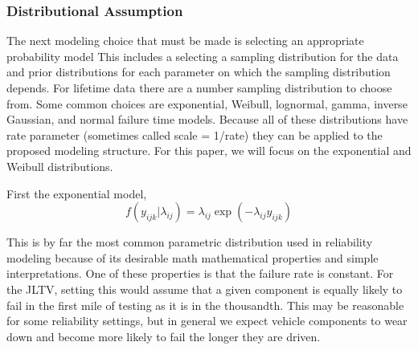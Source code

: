 \documentclass[12pt]{article}
\begin{document}
\subsubsection{Distributional Assumption}
The next modeling choice that must be made is selecting an appropriate
probability model This includes a selecting a sampling distribution for the data
and prior distributions for each parameter on which the sampling distribution
depends.  For lifetime data there are a number sampling distribution to choose
from.  Some common choices are exponential, Weibull, lognormal, gamma, inverse
Gaussian, and normal failure time models.  Because all of these distributions
have rate parameter (sometimes called scale = 1/rate) they can be applied to
the proposed modeling structure.  For this paper, we will focus on the
exponential and Weibull distributions.

First the exponential model,
\begin{equation*}
    f(y_{ijk}|\lambda_{ij})=\lambda_{ij} \exp(-\lambda_{ij}y_{ijk})
\end{equation*}

This is by far the most common parametric distribution used in reliability
modeling because of its desirable math mathematical properties and simple
interpretations.  One of these properties is that the failure rate is constant.
For the JLTV, setting this would assume that a given component is equally likely
to fail in the first mile of testing as it is in the thousandth.  This may be
reasonable for some reliability settings, but in general we expect vehicle
components to wear down and become more likely to fail the longer they are
driven.
\end{document}
